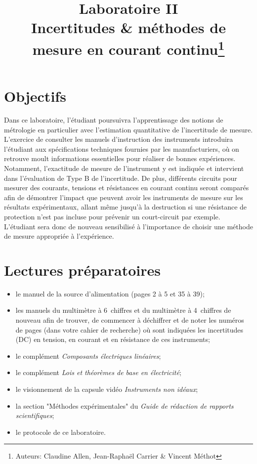 \documentclass[canadien,12pt,oneside,letterpaper]{article}
\title{\textbf{Laboratoire II}\\Incertitudes \& méthodes de mesure en courant continu\thanks{Auteurs: Claudine Allen, Jean-Raphaël Carrier \& Vincent Méthot}}
\date{}
\begin{document}
\maketitle \vspace{-2cm}

\section{Objectifs}

Dans ce laboratoire, l’étudiant poursuivra l’apprentissage des notions de métrologie en particulier avec l’estimation quantitative de l’incertitude de mesure. L’exercice de consulter les manuels d’instruction des instruments introduira l’étudiant aux spécifications techniques fournies par les manufacturiers, où on retrouve moult informations essentielles pour réaliser de bonnes expériences. Notamment, l’exactitude de mesure de l’instrument y est indiquée et intervient dans l’évaluation de Type B de l’incertitude. De plus, différents circuits pour mesurer des courants, tensions et résistances en courant continu seront comparés afin de démontrer l’impact que peuvent avoir les instruments de mesure sur les résultats expérimentaux, allant même jusqu’à la destruction si une résistance de protection n’est pas incluse pour prévenir un court-circuit par exemple. L’étudiant sera donc de nouveau sensibilisé à l’importance de choisir une méthode de mesure appropriée à l’expérience.


\section[Lectures préparatoires]{Lectures préparatoires} \label{sec:prep}
\begin{itemize} \itemsep4pt
\item le manuel de la source d'alimentation (pages 2 à 5 et 35 à 39);
\item les manuels du multimètre à 6\textonehalf~chiffres et du multimètre à 4\textonehalf~chiffres de nouveau afin de trouver,  de commencer à déchiffrer et de noter les numéros de pages (dans votre cahier de recherche) où sont indiquées les incertitudes (DC) en tension, en courant et en résistance de ces instruments;
\item le complément \textit{Composants électriques linéaires};
\item le complément \textit{Lois et théorèmes de base en électricité};
\item le visionnement de la capsule vidéo \textit{Instruments non idéaux};
\item la section "Méthodes expérimentales" du \textit{Guide de rédaction de rapports scientifiques};
\item le protocole de ce laboratoire.
\end{itemize}
\vspace{1ex}
\noindent{}
\end{document}
